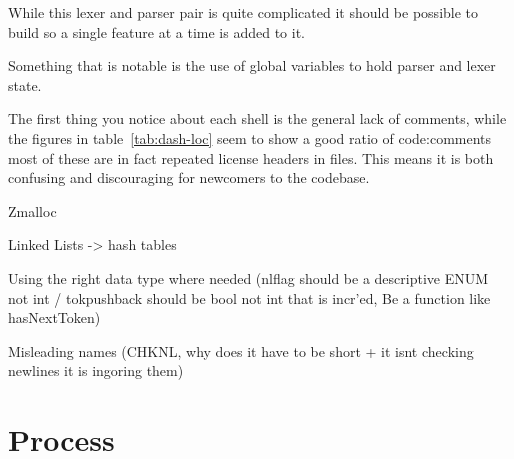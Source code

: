 While this lexer and parser pair is quite complicated it should be possible to build so a single feature at a time is added to it.

Something that is notable is the use of global variables to hold parser and lexer state.

The first thing you notice about each shell is the general lack of comments, while the figures in table~\ref{tab:dash-loc} seem to show a good ratio of code:comments most of these are in fact repeated license headers in files.
This means it is both confusing and discouraging for newcomers to the codebase. 



Zmalloc

Linked Lists -> hash tables

Using the right data type where needed (nlflag should be a descriptive ENUM not int / tokpushback should be bool not int that is incr'ed, Be a function like hasNextToken)

Misleading names (CHKNL, why does it have to be short + it isnt checking newlines it is ingoring them)





\section{Process}

